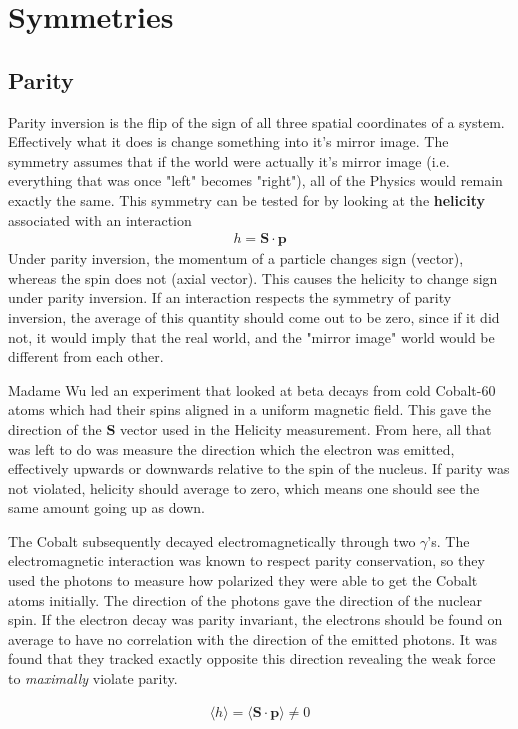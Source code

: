 \section{Symmetries}
\subsection{Parity}
Parity inversion is the flip of the sign of all three spatial coordinates of a system. Effectively what it does is change something into it's mirror image. The symmetry assumes that if the world were actually it's mirror image (i.e. everything that was once "left" becomes "right"), all of the Physics would remain exactly the same. This symmetry can be tested for by looking at the \textbf{helicity} associated with an interaction
\begin{align}
h = \textbf{S}\cdot\textbf{p}
\end{align}
Under parity inversion, the momentum of a particle changes sign (vector), whereas the spin does not (axial vector). This causes the helicity to change sign under parity inversion. If an interaction respects the symmetry of parity inversion, the average of this quantity should come out to be zero, since if it did not, it would imply that the real world, and the "mirror image" world would be different from each other.

Madame Wu led an experiment that looked at beta decays from cold Cobalt-60 atoms which had their spins aligned in a uniform magnetic field. This gave the direction of the $\textbf{S}$ vector used in the Helicity measurement. From here, all that was left to do was measure the direction which the electron was emitted, effectively upwards or downwards relative to the spin of the nucleus. If parity was not violated, helicity should average to zero, which means one should see the same amount going up as down.

The Cobalt subsequently decayed electromagnetically through two $\gamma$'s. The electromagnetic interaction was known to respect parity conservation, so they used the photons to measure how polarized they were able to get the Cobalt atoms initially. The direction of the photons gave the direction of the nuclear spin. If the electron decay was parity invariant, the electrons should be found on average to have no correlation with the direction of the emitted photons. It was found that they tracked exactly opposite this direction revealing the weak force to \emph{maximally} violate parity.

\begin{align}
\langle h \rangle = \langle \textbf{S}\cdot\textbf{p} \rangle \neq 0
\end{align}

